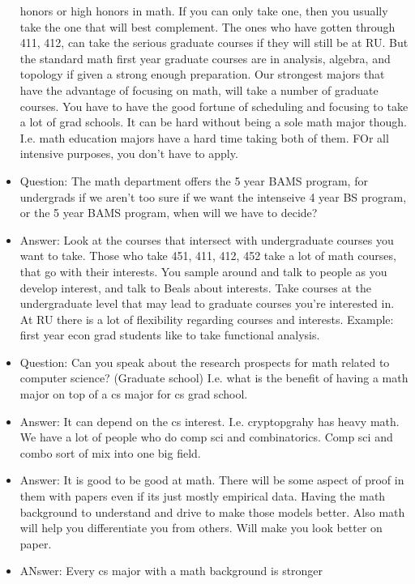\documentclass[10pt]{article}
\theoremstyle{definition}
\begin{document}
\begin{itemize}
    honors or high honors in math. If you can only take one, then
    you usually take the one that will best complement. The ones
    who have gotten through 411, 412, can take the serious
    graduate courses if they will still be at RU. But the standard
    math first year graduate courses are in analysis, algebra, and
    topology if given a strong enough preparation. Our strongest
    majors that have the advantage of focusing on math, will take
    a number of graduate courses. You have to have the good
    fortune of scheduling and focusing to take a lot of grad
    schools. It can be hard without being a sole math major
    though. I.e. math education majors have a hard time taking
    both of them. FOr all intensive purposes, you don't have to
    apply. 
  \item Question: The math department offers the 5 year BAMS
    program, for undergrads if we aren't too sure if we want the
    intenseive 4 year BS program, or the 5 year BAMS
    program, when will we have to decide?
  \item Answer: Look at the courses that intersect with
    undergraduate courses you want to take. Those who take 451,
    411, 412, 452 take a lot of math courses, that go with their
    interests. You sample around and talk to people as you develop
    interest, and talk to Beals about interests. Take courses at
    the undergraduate level that may lead to graduate courses
    you're interested in. At RU there is a lot of flexibility
    regarding courses and interests. Example: first year econ grad
    students like to take functional analysis. 
  \item Question: Can you speak about the research prospects for
    math related to computer science? (Graduate school) I.e. what
    is the benefit of having a math major on top of a cs major for
    cs grad school.
  \item Answer: It can depend on the cs
    interest. I.e. cryptopgrahy has heavy math. We have a lot of
    people who do comp sci and combinatorics. Comp sci and combo
    sort of mix into one big field.
  \item Answer: It is good to be good at math. There will be some
    aspect of proof in them with papers even if its just mostly
    empirical data. Having the math background to understand and
    drive to make those models better. Also math will help you
    differentiate you from others. Will make you look better on
    paper. 
  \item ANswer: Every cs major with a math background is stronger

\end{itemize}
\end{document}
